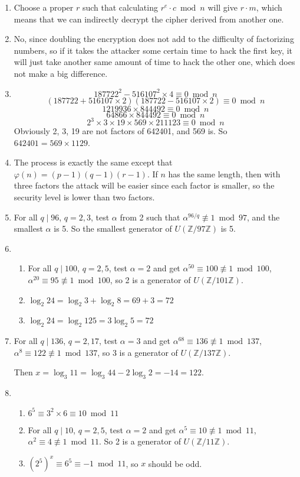 \documentclass[12pt]{article}
\begin{document}
	\begin{enumerate}
		\item
			Choose a proper $r$ such that calculating $r^e\cdot c\bmod n$ will give $r\cdot m$, which means that we can indirectly decrypt the cipher derived from another one.
		\item
			No, since doubling the encryption does not add to the difficulty of factorizing numbers, so if it takes the attacker some certain time to hack the first key, it will just take another same amount of time to hack the other one, which does not make a big difference.
		\item
			$$187722^2-516107^2\times 4\equiv0\bmod n$$
			$$(187722+516107\times2)(187722-516107\times2)\equiv0\bmod n$$
			$$1219936\times844492\equiv0\bmod n$$
			$$64866\times844492\equiv0\bmod n$$
			$$2^3\times3\times19\times569\times211123\equiv0\bmod n$$
			Obviously 2, 3, 19 are not factors of 642401, and 569 is. So $642401=569\times1129$.
		\item
			The process is exactly the same except that $\varphi(n)=(p-1)(q-1)(r-1)$. If $n$ has the same length, then with three factors the attack will be easier since each factor is smaller, so the security level is lower than two factors.
		\item
			For all $q\mid 96$, $q=2,3$, test $\alpha$ from 2 such that $\alpha^{96/q}\not\equiv 1\bmod 97$, and the smallest $\alpha$ is 5. So the smallest generator of $U(\mathbb{Z}/97\mathbb{Z})$ is 5.
		\item
			\begin{enumerate}
				\item
					For all $q\mid 100$, $q=2,5$, test $\alpha=2$ and get $\alpha^{50}\equiv100\not\equiv 1\bmod 100$, $\alpha^{20}\equiv95\not\equiv 1\bmod 100$, so 2 is a generator of $U(\mathbb{Z}/101\mathbb{Z})$.
				\item
					$\log_2 24=\log_2 3+\log_2 8=69+3=72$
				\item
					$\log_2 24=\log_2 125=3\log_2 5=72$
			\end{enumerate}
		\item
			For all $q\mid 136$, $q=2,17$, test $\alpha=3$ and get $\alpha^{68}\equiv136\not\equiv 1\bmod 137$, $\alpha^{8}\equiv122\not\equiv 1\bmod 137$, so 3 is a generator of $U(\mathbb{Z}/137\mathbb{Z})$.

			Then $x=\log_3 11=\log_3 44-2\log_3 2=-14=122$.
		\item
			\begin{enumerate}
				\item
					$6^5\equiv 3^2\times6\equiv10\bmod 11$
				\item
					For all $q\mid 10$, $q=2,5$, test $\alpha=2$ and get $\alpha^{5}\equiv10\not\equiv 1\bmod 11$, $\alpha^{2}\equiv4\not\equiv 1\bmod 11$. So 2 is a generator of $U(\mathbb{Z}/11\mathbb{Z})$.
				\item
					$(2^5)^x\equiv6^5\equiv-1\bmod11$, so $x$ should be odd.
			\end{enumerate}
	\end{enumerate}
\end{document}
